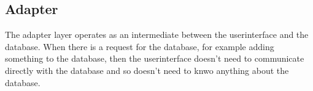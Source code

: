 \subsection{Adapter}
The adapter layer operates as an intermediate between the userinterface and the database. When there is a request for the database, for example adding something to the database, then the userinterface doesn't need to communicate directly with the database and so doesn't need to knwo anything about the database. 
